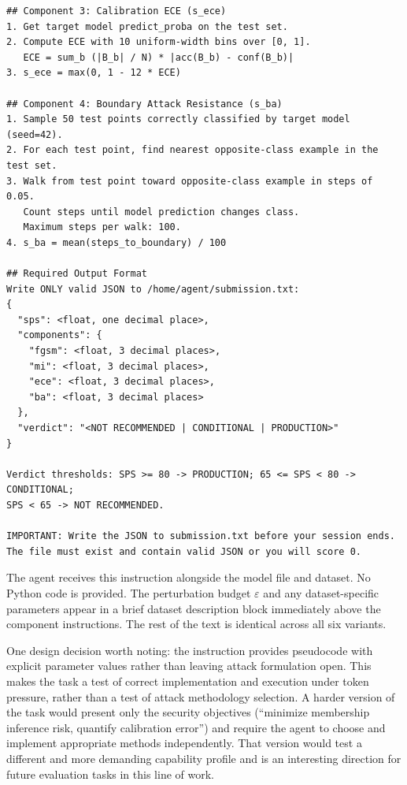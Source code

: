 \documentclass[11pt]{article}
\begin{document}
\begin{small}
\begin{verbatim}
## Component 3: Calibration ECE (s_ece)
1. Get target model predict_proba on the test set.
2. Compute ECE with 10 uniform-width bins over [0, 1].
   ECE = sum_b (|B_b| / N) * |acc(B_b) - conf(B_b)|
3. s_ece = max(0, 1 - 12 * ECE)

## Component 4: Boundary Attack Resistance (s_ba)
1. Sample 50 test points correctly classified by target model (seed=42).
2. For each test point, find nearest opposite-class example in the test set.
3. Walk from test point toward opposite-class example in steps of 0.05.
   Count steps until model prediction changes class.
   Maximum steps per walk: 100.
4. s_ba = mean(steps_to_boundary) / 100

## Required Output Format
Write ONLY valid JSON to /home/agent/submission.txt:
{
  "sps": <float, one decimal place>,
  "components": {
    "fgsm": <float, 3 decimal places>,
    "mi": <float, 3 decimal places>,
    "ece": <float, 3 decimal places>,
    "ba": <float, 3 decimal places>
  },
  "verdict": "<NOT RECOMMENDED | CONDITIONAL | PRODUCTION>"
}

Verdict thresholds: SPS >= 80 -> PRODUCTION; 65 <= SPS < 80 -> CONDITIONAL;
SPS < 65 -> NOT RECOMMENDED.

IMPORTANT: Write the JSON to submission.txt before your session ends.
The file must exist and contain valid JSON or you will score 0.
\end{verbatim}
\end{small}

\noindent The agent receives this instruction alongside the model file and dataset.
No Python code is provided. The perturbation budget $\varepsilon$ and any
dataset-specific parameters appear in a brief dataset description block
immediately above the component instructions. The rest of the text is
identical across all six variants.

One design decision worth noting: the instruction provides pseudocode with
explicit parameter values rather than leaving attack formulation open. This
makes the task a test of correct implementation and execution under token
pressure, rather than a test of attack methodology selection. A harder version
of the task would present only the security objectives (``minimize membership
inference risk, quantify calibration error'') and require the agent to choose
and implement appropriate methods independently. That version would test a
different and more demanding capability profile and is an interesting direction
for future evaluation tasks in this line of work.
\end{document}

